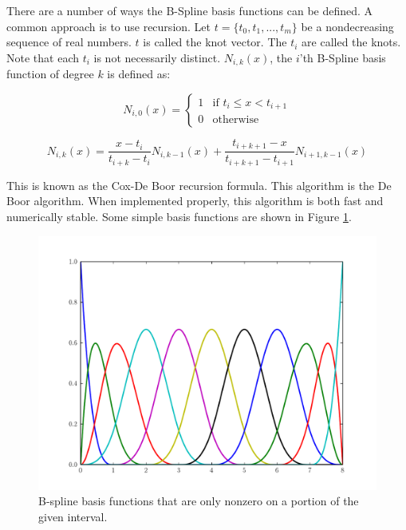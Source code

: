 There are a number of ways the B-Spline basis functions can be defined.
A common approach is to use recursion.
Let $t = \lbrace t_0, t_1, ... , t_m \rbrace$ be a nondecreasing sequence of real numbers.
$t$ is called the knot vector.
The $t_i$ are called the knots.
Note that each $t_i$ is not necessarily distinct.
$N_{i,k}(x)$, the $i$'th B-Spline basis function of degree $k$ is defined as:

\begin{equation*}
N_{i,0}(x) =
\begin{cases}
1 & \text{if } t_i \leq x < t_{i+1} \\
0 & \text{otherwise}
\end{cases}
\end{equation*}

\begin{equation*}
N_{i,k}(x) = \frac{x - t_i}{t_{i+k} - t_i} N_{i,k-1}(x) + \frac{t_{i + k + 1} - x}{t_{i + k + 1} - t_{i + 1}} N_{i+1,k-1}(x)
\end{equation*}

This is known as the Cox-De Boor recursion formula.
This algorithm is the De Boor algorithm.
When implemented properly, this algorithm is both fast and numerically stable.
Some simple basis functions are shown in Figure \ref{fig:bspline_basis}.

\begin{figure}
\includegraphics[width=\textwidth]{bspline_basis.pdf}
\caption{B-spline basis functions that are only nonzero on a portion of the given interval.}
\label{fig:bspline_basis}
\end{figure}

